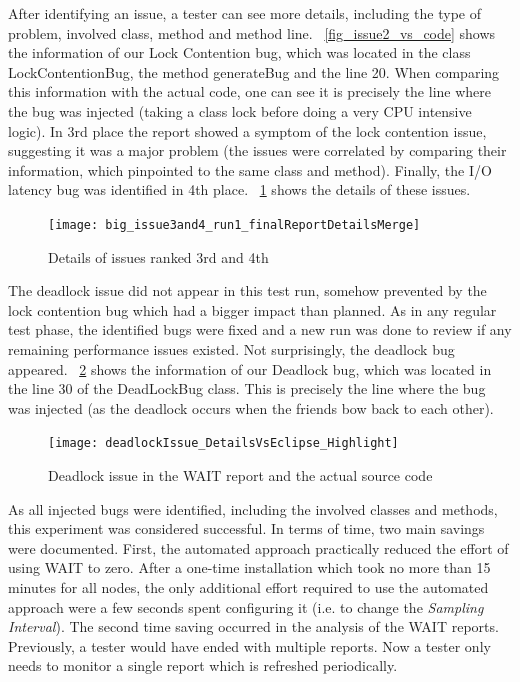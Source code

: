 \documentclass[runningheads,a4paper]{llncs}
\begin{document}
After identifying an issue, a tester can see more details, including the type of
problem, involved class, method and method line. \figurename
~\ref{fig_issue2_vs_code} shows the information of our Lock Contention bug,
which was located in the class LockContentionBug, the method generateBug and the
line 20. When comparing this information with the actual code, one can see it
is precisely the line where the bug was injected (taking a class lock before
doing a very CPU intensive logic). In 3rd place the report showed a symptom of
the lock contention issue, suggesting it was a major problem (the issues were
correlated by comparing their information, which pinpointed to the same class and
method). Finally, the I/O latency bug was identified in 4th place. \figurename
~\ref{fig_issues34} shows the details of these issues.

\begin{figure}[!h]
\centering
\texttt{[image: big\_issue3and4\_run1\_finalReportDetailsMerge]}
\caption{Details of issues ranked 3rd and 4th}
\label{fig_issues34}
\end{figure}

The deadlock issue did not appear in this test run, somehow prevented by the
lock contention bug which had a bigger impact than planned. As in any regular
test phase, the identified bugs were fixed and a new run was done to review
if any remaining performance issues existed. Not surprisingly, the deadlock bug
appeared. \figurename ~\ref{fig_dlissue_vs_code} shows the information of our
Deadlock bug, which was located in the line 30 of the DeadLockBug class. This is
precisely the line where the bug was injected (as the deadlock occurs when the
friends bow back to each other).

\begin{figure}[!h]
\centering
\texttt{[image: deadlockIssue\_DetailsVsEclipse\_Highlight]}
\caption{Deadlock issue in the WAIT report and the actual source code}
\label{fig_dlissue_vs_code}
\end{figure}


As all injected bugs were identified, including the involved classes and
methods, this experiment was considered successful. In terms of time, two main
savings were documented. First, the automated approach practically reduced the
effort of using WAIT to zero. After a one-time installation which took no more
than 15 minutes for all nodes, the only additional effort required to use the
automated approach were a few seconds spent configuring it (i.e. to change the
\emph{Sampling Interval}). The second time saving occurred in the analysis of the 
WAIT reports. Previously, a tester would have ended with multiple reports. Now a 
tester only needs to monitor a single report which is refreshed periodically.
\end{document}
